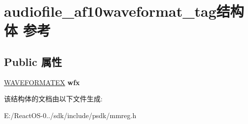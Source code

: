 \hypertarget{structaudiofile__af10waveformat__tag}{}\section{audiofile\+\_\+af10waveformat\+\_\+tag结构体 参考}
\label{structaudiofile__af10waveformat__tag}
\subsection*{Public 属性}
\begin{DoxyCompactItemize}
\item 
\mbox{\label{structaudiofile__af10waveformat__tag_ae28a37596c3cb35d271834aa5b2ce30b}} 
\hyperlink{struct_w_a_v_e_f_o_r_m_a_t_e_x}{W\+A\+V\+E\+F\+O\+R\+M\+A\+T\+EX} {\bfseries wfx}
\end{DoxyCompactItemize}


该结构体的文档由以下文件生成\+:\begin{DoxyCompactItemize}
\item 
E\+:/\+React\+O\+S-\/0../sdk/include/psdk/mmreg.\+h\end{DoxyCompactItemize}
